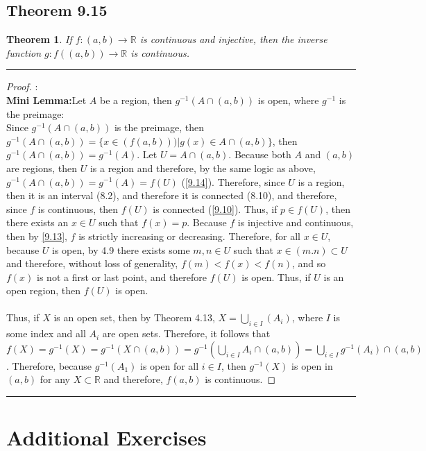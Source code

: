 \documentclass[openany, amssymb, psamsfonts]{amsart}
\newcommand{\bbR}{\mathbb{R}}
\newtheorem{thm}{Theorem}[section]
\theoremstyle{definition}
\numberwithin{equation}{section}
\begin{document}
\subsection*{Theorem 9.15}
\begin{thm}\label{invfun}
\label{9.15}
If $f\colon (a,b)\to\bbR$ is continuous and injective, then the inverse function $g\colon f((a,b))\to \bbR$ is continuous.
\end{thm}
\vspace{4pt}     \hrule   \vspace{4pt}\begin{proof}:\\
\textbf{Mini Lemma:}Let $A$ be a region, then $g^{-1}(A\cap (a,b))$ is open, where $g^{-1}$ is the preimage:\\ Since $g^{-1}(A\cap (a,b))$ is the preimage, then $g^{-1}(A\cap (a,b)) = \{x\in (f(a,b)))| g(x) \in A\cap (a,b)\}$, then $g^{-1}(A\cap (a,b)) = g^{-1}(A)$. Let $U = A \cap (a,b)$. Because both $A$ and $(a,b)$ are regions, then $U$ is a region and therefore, by the same logic as above, $g^{-1}(A\cap (a,b)) = g^{-1}(A) = f(U)$ (\ref{9.14}). Therefore, since $U$ is a region, then it is an interval (8.2), and therefore it is connected (8.10), and therefore, since $f$ is continuous, then $f(U)$ is connected (\ref{9.10}). Thus, if $p\in f(U)$, then there exists an $x\in U$ such that $f(x) = p$. Because $f$ is injective and continuous, then by \ref{9.13}, $f$ is strictly increasing or decreasing. Therefore, for all $x\in U$, because $U$ is open, by 4.9 there exists some $m,n \in U$ such that $x\in (m.n)\subset U$ and therefore, without loss of generality, $f(m) < f(x) < f(n)$, and so $f(x)$ is not a first or last point, and therefore $f(U)$ is open. Thus, if $U$ is an open region, then $f(U)$ is open. \\\\Thus, if $X$ is an open set, then by Theorem 4.13, $X = \bigcup_{i\in I}(A_i)$, where $I$ is some index and all $A_i$ are open sets. Therefore, it follows that $f(X) = g^{-1}(X) = g^{-1}(X\cap (a,b)) = g^{-1}(\bigcup_{i\in I}A_i\cap (a,b)) = \bigcup_{i\in I}g^{-1}(A_i)\cap (a,b)$. Therefore, because $g^{-1}(A_1)$ is open for all $i\in I$, then $g^{-1}(X)$ is open in $(a,b)$ for any $X\subset \bbR$ and therefore, $f(a,b)$ is continuous. 
\end{proof}\vspace{4pt}     \hrule   \vspace{4pt}

\section*{Additional Exercises}
\end{document}
